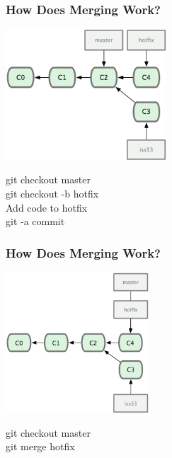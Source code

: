 \begin{frame}
\frametitle{\large How Does Merging Work?}
\begin{center}
\includegraphics[width=0.45\textwidth]{img/branching_images/f4.png}
\end{center}
\begin{center}
\small git checkout master \\
\small git checkout -b hotfix \\
\small Add code to hotfix\\
\small git -a commit
\end{center}
\end{frame}
\note{}

\begin{frame}
\frametitle{\large How Does Merging Work?}
\begin{center}
\includegraphics[width=0.4\textwidth]{img/branching_images/f5.png}
\end{center}
\vspace{2mm}
\begin{center}
git checkout master \\
git merge hotfix
\end{center}
\end{frame}
\note{}

